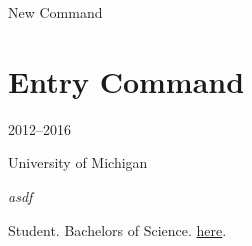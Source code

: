 \documentclass[letterpaper]{article}
\author{Avinash Saravanan}
\newcommand{\nc}{New Command}
\newcommand{\entry}[4]{
\begin{minipage}[t]{.15\textwidth}
\hfill \textsc{#1}
\end{minipage}
\hfill\vline\hfill
\begin{minipage}[t]{.80\textwidth}
#2

\textit{#3}

\footnotesize{#4}
\end{minipage}\\\vspace{.25cm}}
\begin{document}
\nc

\section{Entry Command}
\entry{2012--2016}{University of Michigan}{asdf}{Student. Bachelors of Science. \href{https://www.google.com}{here}.}
\end{document}
